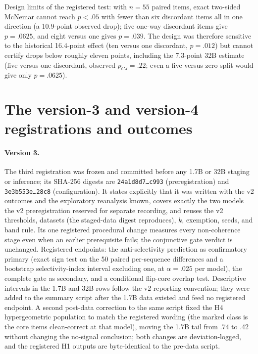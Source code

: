 \documentclass{article}
\begin{document}
Design limits of the registered test: with $n=55$ paired items, exact two-sided McNemar
cannot reach $p<.05$ with fewer than six discordant items all in one direction (a
10.9-point observed drop); five one-way discordant items give $p=.0625$, and eight versus
one gives $p=.039$. The design was therefore sensitive to the historical 16.4-point
effect (ten versus one discordant, $p=.012$) but cannot certify drops below roughly
eleven points, including the 7.3-point 32B estimate (five versus one discordant,
observed $p_{CJ}=.22$; even a five-versus-zero split would give only $p=.0625$).

\section{The version-3 and version-4 registrations and outcomes}
\label{app:v3}

\paragraph{Version 3.}
The third registration was frozen and committed before any 1.7B or 32B staging or
inference; its SHA-256 digests are \texttt{24a1d8d7\ldots{}c993} (preregistration) and
\texttt{3e3b553e\ldots{}28c8} (configuration). It states explicitly that it was written
with the v2 outcomes and the exploratory reanalysis known, covers exactly the two models
the v2 preregistration reserved for separate recording, and reuses the v2 thresholds,
datasets (the staged-data digest reproduces), $k$, exemption, seeds, and band rule. Its
one registered procedural change measures every non-coherence stage even when an earlier
prerequisite fails; the conjunctive gate verdict is unchanged. Registered endpoints: the
anti-selectivity prediction as confirmatory primary (exact sign test on the 50 paired
per-sequence differences and a bootstrap selectivity-index interval excluding one, at
$\alpha=.025$ per model), the complete gate as secondary, and a conditional flip-core
overlap test. Descriptive intervals in the 1.7B and 32B rows follow the v2 reporting
convention; they were added to the summary script after the 1.7B data existed and feed no
registered endpoint. A second post-data correction to the same script fixed the H4
hypergeometric population to match the registered wording (the marked class is the core
items clean-correct at that model), moving the 1.7B tail from .74 to .42 without changing
the no-signal conclusion; both changes are deviation-logged, and the registered H1
outputs are byte-identical to the pre-data script.
\end{document}

